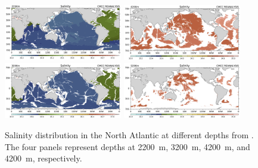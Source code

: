 \begin{figure}
	\centering
	\includegraphics[width=0.46\textwidth]{figs/salinity-2200m-cmcc}
	\hfill
	\includegraphics[width=0.46\textwidth]{figs/salinity-4200m-cmcc}
	\vspace{1em}
	\includegraphics[width=0.46\textwidth]{figs/salinity-3200m-cmcc}
	\hfill
	\includegraphics[width=0.46\textwidth]{figs/salinity-5200m-cmcc}
	\caption{Salinity distribution in the North Atlantic at different depths from \CMCCreanalysis. The four panels represent depths at \qty{2200}{\meter}, \qty{3200}{m}, \qty{4200}{\meter}, and \qty{4200}{\meter}, respectively.}
	\label{fig:salinity-different-detphs-cmcc}
\end{figure}


